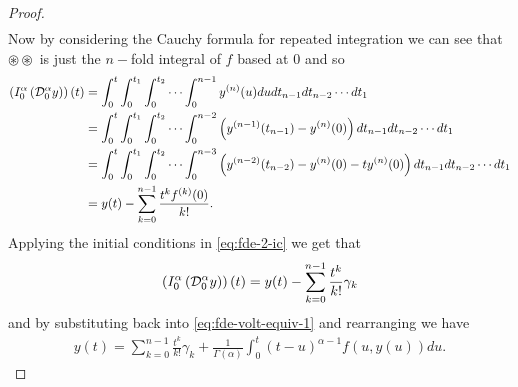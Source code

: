 \documentclass{article}
\begin{document}
\begin{proof}
\begin{align*}
	\end{align*}
	Now by considering the Cauchy formula for repeated integration we can see that $ \circledast \circledast $ is just the $n-$fold integral
	of $ f $ based at $ 0 $ and so
	\begin{align*}
		\left( I_{0}^{\alpha} \left( \mathcal{D}_{0}^{\alpha} y \right) \right)(t) &= \int_0^t \int_0^{t_1} \int_0^{t_2} \cdots \int_0^{n-1} y^{(n)}(u) du dt_{n-1} dt_{n-2} \cdots dt_{1} \\
			&= \int_0^t \int_0^{t_1} \int_0^{t_2} \cdots \int_0^{n-2} \left(y^{(n-1)}(t_{n-1}) - y^{(n)}(0) \right)dt_{n-1}dt_{n-2}\cdots dt_{1} \\
			&= \int_0^t \int_0^{t_1} \int_0^{t_2} \cdots \int_0^{n-3} \left(y^{(n-2)}(t_{n-2}) - y^{(n)}(0) - ty^{(n)}(0) \right)dt_{n-1}dt_{n-2}\cdots dt_{1} \\
			&= y(t) - \sum_{k=0}^{n-1} \frac{t^k f^{(k)}(0)}{k!}.
	\end{align*}
	Applying the initial conditions in \eqref{eq:fde-2-ic} we get that 
	\begin{align*}
		\left( I_{0}^{\alpha} \left( \mathcal{D}_{0}^{\alpha} y \right) \right)(t) = y(t) - \sum_{k=0}^{n-1} \frac{t^k}{k!} \gamma_k
	\end{align*}
	and by substituting back into \eqref{eq:fde-volt-equiv-1} and rearranging we have
	\begin{align*}
		y(t) = \sum_{k=0}^{n-1} \frac{t^k}{k!} \gamma_k + \frac{1}{\Gamma(\alpha)} \int_0^t (t-u)^{\alpha-1} f(u,y(u))du.
	\end{align*}
\end{proof}
\end{document}
